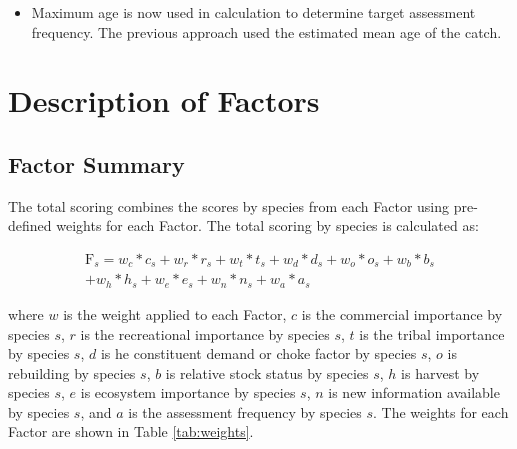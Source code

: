 \documentclass[11pt,
  english,
  a4paper,
]{article}
\providecommand{\tightlist}{%
  \setlength{\itemsep}{0pt}\setlength{\parskip}{0pt}}
\providecommand{\tightlist}{%
  \setlength{\itemsep}{0pt}\setlength{\parskip}{0pt}}
\begin{document}
\begin{itemize}
  \begin{itemize}
  \tightlist
  \item
    Maximum age is now used in calculation to determine target assessment frequency. The previous approach used the estimated mean age of the catch.
  \end{itemize}
\end{itemize}

\newpage

\hypertarget{description-of-factors}{%
\section{Description of Factors}\label{description-of-factors}}

\hypertarget{factor-summary}{%
\subsection{Factor Summary}\label{factor-summary}}

The total scoring combines the scores by species from each Factor using pre-defined weights for each Factor. The total scoring by species is calculated as:

\begin{equation}
\begin{aligned}
    \text{F}_s = w_c*c_{s} + w_r*r_{s} + w_t*t_{s} + w_d*d_{s} + w_o*o_{s} + w_b*b_s \\
             + w_h*h_s + w_e*e_s + w_n*n_s + w_a*a_s
\end{aligned}
\end{equation}

where \(w\) is the weight applied to each Factor, \(c\) is the commercial importance by species \(s\), \(r\) is the recreational importance by species \(s\), \(t\) is the tribal importance by species \(s\), \(d\) is he constituent demand or choke factor by species \(s\), \(o\) is rebuilding by species \(s\), \(b\) is relative stock status by species \(s\), \(h\) is harvest by species \(s\), \(e\) is ecosystem importance by species \(s\), \(n\) is new information available by species \(s\), and \(a\) is the assessment frequency by species \(s\). The weights for each Factor are shown in Table \ref{tab:weights}.

\begingroup\fontsize{10}{12}\selectfont
\begingroup\fontsize{10}{12}\selectfont
\end{document}
